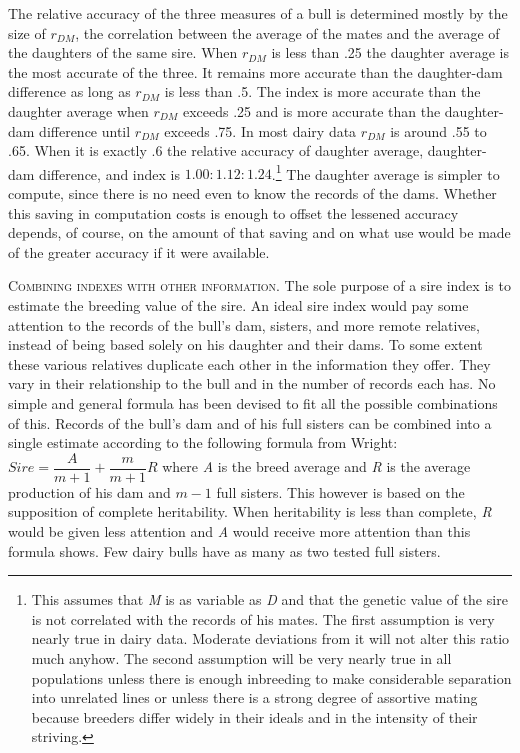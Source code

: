 The relative accuracy of the three measures of a bull is determined
mostly by the size of $r_{DM}$, the correlation between the average of the
mates and the average of the daughters of the same sire. When $r_{DM}$ is
less than .25 the daughter average is the most accurate of the three. It
remains more accurate than the daughter-dam difference as long as
$r_{DM}$ is less than .5. The index is more accurate than the daughter average
when $r_{DM}$ exceeds .25 and is more accurate than the daughter-dam
difference until $r_{DM}$ exceeds .75. In most dairy data $r_{DM}$ is around
.55 to .65. When it is exactly .6 the relative accuracy of daughter average,
daughter-dam difference, and index is $1.00 : 1.12 : 1.24$.\footnote{This
assumes that \textit{M} is as variable as \textit{D} and that the genetic
value of the sire is not correlated with the records of his mates. The first
assumption is very nearly true in dairy data. Moderate deviations from it
will not alter this ratio much anyhow. The second assumption will be very
nearly true in all populations unless there is enough inbreeding to make
considerable separation into unrelated lines or unless there is a strong
degree of assortive mating because breeders differ widely in their ideals
and in the intensity of their striving.} The daughter average is simpler
to compute, since there is no need even to know the records of the dams.
Whether this saving in computation costs is enough to offset the lessened
accuracy depends, of course, on the amount of that saving and on what use
would be made of the greater accuracy if it were available.

\textsc{Combining indexes with other information}. The sole purpose of
a sire index is to estimate the breeding value of the sire. An ideal
sire index would pay some attention to the records of the bull's dam,
sisters, and more remote relatives, instead of being based solely on his
daughter and their dams. To some extent these various relatives duplicate
each other in the information they offer. They vary in their relationship
to the bull and in the number of records each has. No simple
and general formula has been devised to fit all the possible combinations
of this. Records of the bull's dam and of his full sisters can be
combined into a single estimate according to the following formula
from Wright: \(Sire = \dfrac{A}{m + 1} + \dfrac{m}{m + 1}R\) where
\textit{A} is the breed average and \textit{R} is the average production
of his dam and $m - 1$ full sisters. This however is based on the
supposition of complete heritability. When heritability is less than
complete, \textit{R} would be given less attention and \textit{A} would
receive more attention than this formula shows. Few dairy bulls have as
many as two tested full sisters.

